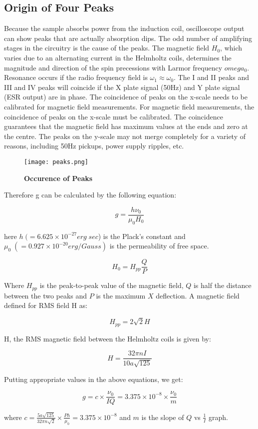 	\subsection{Origin of Four Peaks}
	Because the sample absorbs power from the induction coil, oscilloscope output can show peaks that are actually absorption dips. The odd number of amplifying stages in the circuitry is the cause of the peaks. The magnetic field $H_0$, which varies due to an alternating current in the Helmholtz coils, determines the magnitude and direction of the spin precessions with Larmor frequency $omega_0$. Resonance occurs if the radio frequency field is $\omega_1 \approx \omega_0$. The I and II peaks and III and IV peaks will coincide if the X plate signal (50Hz) and Y plate signal (ESR output) are in phase. The coincidence of peaks on the x-scale needs to be calibrated for magnetic field measurements. For magnetic field measurements, the coincidence of peaks on the x-scale must be calibrated. The coincidence guarantees that the magnetic field has maximum values at the ends and zero at the centre. The peaks on the y-scale may not merge completely for a variety of reasons, including 50Hz pickups, power supply ripples, etc.

		\begin{figure}[H]
			\centering
			\texttt{[image: peaks.png]}
			\caption{\textbf{Occurence of Peaks}}
			\label{fig:4}
		\end{figure}

		Therefore g can be calculated by the following equation:

		$$g = \frac{h\nu_0}{\mu_0 H_0}$$

		here $h\;(=6.625\times 10^{-27} erg\;sec$) is the Plack's constant and $\mu_0\;(=0.927\times 10^{-20} erg/Gauss)$ is the permeability of free space.

		$$H_0 = H_{pp}\frac{Q}{P}$$

		Where $H_{pp}$ is the peak-to-peak value of the magnetic field, $Q$ is half the distance between the two peaks and $P$ is the maximum $X$ deflection. A magnetic field defined for RMS field H as:

		$$H_{pp} = 2\sqrt{2}H$$

		H, the RMS magnetic field between the Helmholtz coils is given by:

		$$H = \frac{32\pi nI}{10a\sqrt{125}}$$

		Putting appropriate values in the above equations, we get:

		\begin{equation}
			g = c\times \frac{\nu_0}{IQ} = 3.375\times 10^{-8} \times \frac{\nu_0}{m}
			\label{eq:1}
		\end{equation}

		where $c = \frac{5a\sqrt{125}}{32\pi n \sqrt{2}}\times\frac{Ph}{\mu_0} = 3.375\times 10^{-8}$ and $m$ is the slope of $Q$ vs $\frac{1}{I}$ graph.
